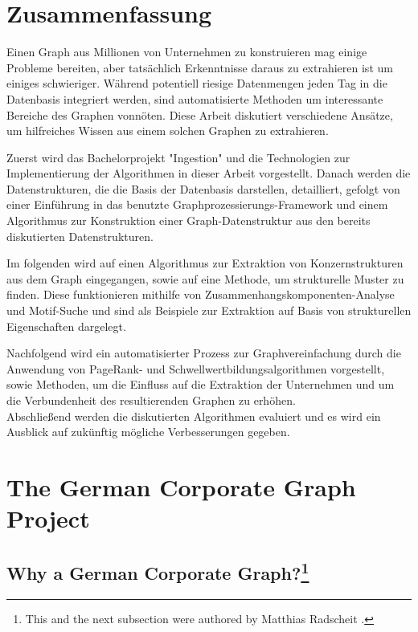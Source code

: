 \documentclass[
  a4paper,     %
  titlepage,   %
  oneside,     %
  parskip      %
]{scrartcl}          %
\begin{document}
  \section*{Zusammenfassung}
  { \large
    Einen Graph aus Millionen von Unternehmen zu konstruieren mag einige Probleme
    bereiten, aber tats\"achlich Erkenntnisse daraus zu extrahieren ist um einiges schwieriger.
    W\"ahrend potentiell riesige Datenmengen jeden Tag in die Datenbasis integriert werden,
    sind automatisierte Methoden um interessante Bereiche des Graphen vonn\"oten.
    Diese Arbeit diskutiert verschiedene Ans\"atze, um hilfreiches Wissen aus einem solchen Graphen zu extrahieren.

    Zuerst wird das Bachelorprojekt "Ingestion" und die Technologien zur Implementierung
    der Algorithmen in dieser Arbeit vorgestellt. Danach werden die Datenstrukturen, die die Basis der
    Datenbasis darstellen, detailliert, gefolgt von einer Einf\"uhrung in das benutzte
    Graphprozessierungs-Framework und einem Algorithmus zur Konstruktion einer Graph-Datenstruktur
    aus den bereits diskutierten Datenstrukturen.

    Im folgenden wird auf einen Algorithmus zur Extraktion von Konzernstrukturen aus dem Graph eingegangen,
    sowie auf eine Methode, um strukturelle Muster zu finden. Diese funktionieren
    mithilfe von Zusammenhangskomponenten-Analyse und Motif-Suche und sind als
    Beispiele zur Extraktion auf Basis von strukturellen Eigenschaften dargelegt.

    Nachfolgend wird ein automatisierter Prozess zur Graphvereinfachung durch die
    Anwendung von PageRank- und Schwellwertbildungsalgorithmen vorgestellt, sowie
    Methoden, um die Einfluss auf die Extraktion der Unternehmen und um die Verbundenheit
    des resultierenden Graphen zu erh\"ohen.\\
    Abschlie{\ss}end werden die diskutierten Algorithmen evaluiert
    und es wird ein Ausblick auf zuk\"unftig m\"ogliche Verbesserungen gegeben.
  }
  \clearpage

  \tableofcontents
  \pagebreak

  \section{The German Corporate Graph Project}
    \subsection[Why a German Corporate Graph?]{Why a German Corporate Graph?\footnote{This and the next subsection were authored by Matthias Radscheit \cite{loeperradscheit}.}}
\end{document}
